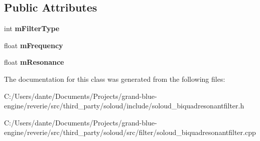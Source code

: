 \subsection*{Public Attributes}
\begin{DoxyCompactItemize}
\item 
\mbox{\label{class_so_loud_1_1_biquad_resonant_filter_a50e3f094f703e4c2780dc935d34ee3b7}} 
int {\bfseries m\+Filter\+Type}
\item 
\mbox{\label{class_so_loud_1_1_biquad_resonant_filter_a4a87bf863804bb3a9cd0a09cc0db00b3}} 
float {\bfseries m\+Frequency}
\item 
\mbox{\label{class_so_loud_1_1_biquad_resonant_filter_a06f7f1c568237c23b9d05fd7695d3a63}} 
float {\bfseries m\+Resonance}
\end{DoxyCompactItemize}


The documentation for this class was generated from the following files\+:\begin{DoxyCompactItemize}
\item 
C\+:/\+Users/dante/\+Documents/\+Projects/grand-\/blue-\/engine/reverie/src/third\+\_\+party/soloud/include/soloud\+\_\+biquadresonantfilter.\+h\item 
C\+:/\+Users/dante/\+Documents/\+Projects/grand-\/blue-\/engine/reverie/src/third\+\_\+party/soloud/src/filter/soloud\+\_\+biquadresonantfilter.\+cpp\end{DoxyCompactItemize}
